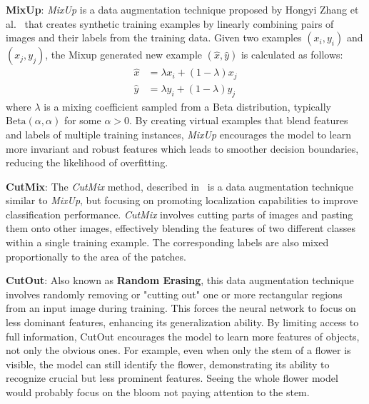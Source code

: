 \textbf{MixUp}: \textit{MixUp} is a data augmentation technique proposed by Hongyi Zhang et al.~\cite{MixupOriginal} that creates synthetic training examples by linearly combining pairs of images and their labels from the training data. Given two examples \( (x_i, y_i) \) and \( (x_j, y_j) \), the Mixup generated new example \( (\hat{x}, \hat{y}) \) is calculated as follows:
\begin{align*}
    \hat{x} &= \lambda x_i + (1-\lambda) x_j \\
    \hat{y} &= \lambda y_i + (1-\lambda) y_j
\end{align*}
where \( \lambda \) is a mixing coefficient sampled from a Beta distribution, typically \( \text{Beta}(\alpha, \alpha) \) for some \( \alpha > 0 \). By creating virtual examples that blend features and labels of multiple training instances, \textit{MixUp} encourages the model to learn more invariant and robust features which leads to smoother decision boundaries, reducing the likelihood of overfitting.


\textbf{CutMix}: The \textit{CutMix} method, described in~\cite{CutMixOriginal} is a data augmentation technique similar to \textit{MixUp}, but focusing on promoting localization capabilities to improve classification performance. \textit{CutMix} involves cutting parts of images and pasting them onto other images, effectively blending the features of two different classes within a single training example. The corresponding labels are also mixed proportionally to the area of the patches.

\textbf{CutOut}: Also known as \textbf{Random Erasing}, this data augmentation technique involves randomly removing or "cutting out" one or more rectangular regions from an input image during training. This forces the neural network to focus on less dominant features, enhancing its generalization ability. By limiting access to full information, CutOut encourages the model to learn more features of objects, not only the obvious ones. For example, even when only the stem of a flower is visible, the model can still identify the flower, demonstrating its ability to recognize crucial but less prominent features. Seeing the whole flower model would probably focus on the bloom not paying attention to the stem.

